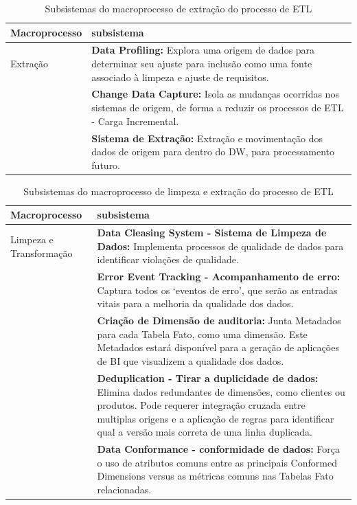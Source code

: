 \begin{table}[h]
	\centering
	\caption{Subsistemas do macroprocesso de extração do processo de ETL}
	\label{subextracao}
	\begin{tabular}{|p{3cm}| p{11cm} |}
	\hline
	Macroprocesso & subsistema\\
	\hline
	Extração & \textbf{Data Profiling:} Explora uma origem de dados para determinar seu ajuste para inclusão como uma fonte associado à limpeza e ajuste de requisitos.\\
	&  \textbf{Change Data Capture:} Isola as mudanças ocorridas nos sistemas de origem, de forma a reduzir os processos de ETL - Carga Incremental.\\
	& \textbf{Sistema de Extração:} Extração e movimentação dos dados de origem para dentro do DW, para processamento futuro.\\
	\hline	
		
	\end{tabular}
\end{table}

\begin{table}[h]
	\centering
	\caption{Subsistemas do macroprocesso de limpeza e extração do processo de ETL}
	\label{sublimpeza}
	\begin{tabular}{|p{3cm}| p{11cm} |}
		\hline
		Macroprocesso & subsistema\\
		\hline
		Limpeza e Transformação &  \textbf{Data Cleasing System - Sistema de Limpeza de Dados:}  Implementa processos de qualidade de dados para identificar violações de qualidade.\\
		& \textbf{Error Event Tracking - Acompanhamento de erro:} Captura todos os ‘eventos de erro’, que serão as entradas vitais para a melhoria da qualidade dos dados.\\
		& \textbf{Criação de Dimensão de auditoria:} Junta Metadados para cada Tabela Fato, como uma dimensão. Este Metadados estará disponível para a geração de aplicações de BI que visualizem  a qualidade dos dados.\\
		& \textbf{Deduplication - Tirar a duplicidade de dados:} Elimina dados redundantes de dimensões, como clientes ou produtos. Pode requerer integração cruzada entre multiplas origens e a aplicação de regras para identificar qual a versão mais correta de uma linha duplicada.\\
		& \textbf{Data Conformance - conformidade de dados:} Força o uso de atributos comuns entre as principais Conformed Dimensions versus as métricas comuns nas Tabelas Fato relacionadas.\\
		\hline
		
	\end{tabular}
\end{table}

